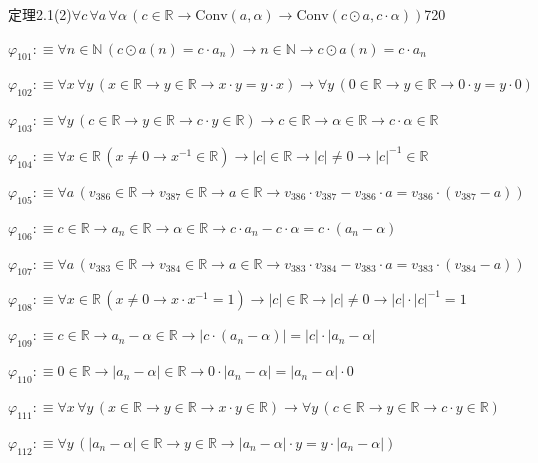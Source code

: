 \begin{fullproof}{定理2.1(2)}{$\forall c\,\forall a\,\forall \alpha\,(c \in \mathbb{R} \to \mathrm{Conv}(a,\alpha) \to \mathrm{Conv}(c \odot a,c \cdot \alpha))$}{720}
\begin{abbrevlist}
\item $\varphi_{101} :\equiv \forall n \in \mathbb{N}\,(c \odot a(n) = c \cdot a_{n}) \to n \in \mathbb{N} \to c \odot a(n) = c \cdot a_{n}$
\item $\varphi_{102} :\equiv \forall x\,\forall y\,(x \in \mathbb{R} \to y \in \mathbb{R} \to x \cdot y = y \cdot x) \to \forall y\,(0 \in \mathbb{R} \to y \in \mathbb{R} \to 0 \cdot y = y \cdot 0)$
\item $\varphi_{103} :\equiv \forall y\,(c \in \mathbb{R} \to y \in \mathbb{R} \to c \cdot y \in \mathbb{R}) \to c \in \mathbb{R} \to \alpha \in \mathbb{R} \to c \cdot \alpha \in \mathbb{R}$
\item $\varphi_{104} :\equiv \forall x \in \mathbb{R}\,(x \neq 0 \to x^{-1} \in \mathbb{R}) \to \lvert c \rvert \in \mathbb{R} \to \lvert c \rvert \neq 0 \to \lvert c \rvert^{-1} \in \mathbb{R}$
\item $\varphi_{105} :\equiv \forall a\,(v_{386} \in \mathbb{R} \to v_{387} \in \mathbb{R} \to a \in \mathbb{R} \to v_{386} \cdot v_{387} - v_{386} \cdot a = v_{386} \cdot (v_{387} - a))$
\item $\varphi_{106} :\equiv c \in \mathbb{R} \to a_{n} \in \mathbb{R} \to \alpha \in \mathbb{R} \to c \cdot a_{n} - c \cdot \alpha = c \cdot (a_{n} - \alpha)$
\item $\varphi_{107} :\equiv \forall a\,(v_{383} \in \mathbb{R} \to v_{384} \in \mathbb{R} \to a \in \mathbb{R} \to v_{383} \cdot v_{384} - v_{383} \cdot a = v_{383} \cdot (v_{384} - a))$
\item $\varphi_{108} :\equiv \forall x \in \mathbb{R}\,(x \neq 0 \to x \cdot x^{-1} = 1) \to \lvert c \rvert \in \mathbb{R} \to \lvert c \rvert \neq 0 \to \lvert c \rvert \cdot \lvert c \rvert^{-1} = 1$
\item $\varphi_{109} :\equiv c \in \mathbb{R} \to a_{n} - \alpha \in \mathbb{R} \to \lvert c \cdot (a_{n} - \alpha) \rvert = \lvert c \rvert \cdot \lvert a_{n} - \alpha \rvert$
\item $\varphi_{110} :\equiv 0 \in \mathbb{R} \to \lvert a_{n} - \alpha \rvert \in \mathbb{R} \to 0 \cdot \lvert a_{n} - \alpha \rvert = \lvert a_{n} - \alpha \rvert \cdot 0$
\item $\varphi_{111} :\equiv \forall x\,\forall y\,(x \in \mathbb{R} \to y \in \mathbb{R} \to x \cdot y \in \mathbb{R}) \to \forall y\,(c \in \mathbb{R} \to y \in \mathbb{R} \to c \cdot y \in \mathbb{R})$
\item $\varphi_{112} :\equiv \forall y\,(\lvert a_{n} - \alpha \rvert \in \mathbb{R} \to y \in \mathbb{R} \to \lvert a_{n} - \alpha \rvert \cdot y = y \cdot \lvert a_{n} - \alpha \rvert)$

\end{abbrevlist}
\end{fullproof}
